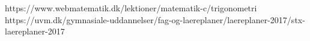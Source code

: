 https://www.webmatematik.dk/lektioner/matematik-c/trigonometri
https://uvm.dk/gymnasiale-uddannelser/fag-og-laereplaner/laereplaner-2017/stx-laereplaner-2017
